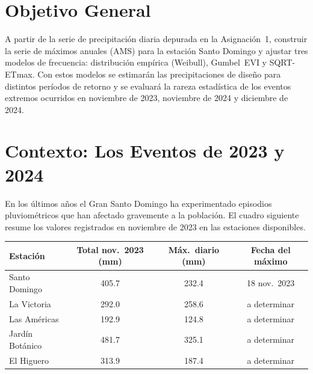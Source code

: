 \documentclass[11pt]{article}
\begin{document}
\section*{Objetivo General}

A partir de la serie de precipitación diaria depurada en la Asignación~1, construir
la serie de máximos anuales (AMS) para la estación Santo Domingo y ajustar tres
modelos de frecuencia: distribución empírica (Weibull), Gumbel~EVI y SQRT-ETmax.
Con estos modelos se estimarán las precipitaciones de diseño para distintos períodos
de retorno y se evaluará la rareza estadística de los eventos extremos ocurridos en
noviembre de 2023, noviembre de 2024 y diciembre de 2024.

\section*{Contexto: Los Eventos de 2023 y 2024}

En los últimos años el Gran Santo Domingo ha experimentado episodios pluviométricos
que han afectado gravemente a la población.  El cuadro siguiente resume los valores
registrados en noviembre de 2023 en las estaciones disponibles.

\begin{center}
\small
{}
\begin{tabular}{lccc}
\toprule
\textbf{Estación} & \textbf{Total nov.\ 2023 (mm)} & \textbf{Máx.\ diario (mm)} & \textbf{Fecha del máximo} \\
\midrule
Santo Domingo   & 405.7 & 232.4 & 18 nov.\ 2023 \\
La Victoria     & 292.0 & 258.6 & a determinar \\
Las Américas    & 192.9 & 124.8 & a determinar \\
Jardín Botánico & 481.7 & 325.1 & a determinar \\
El Higuero      & 313.9 & 187.4 & a determinar \\
\bottomrule
\end{tabular}

\end{center}
\end{document}
